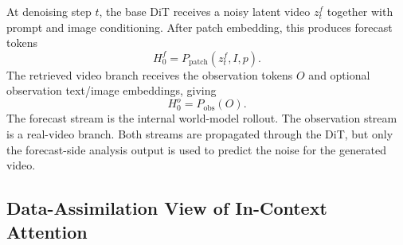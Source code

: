 \documentclass{article}
\begin{document}
At denoising step $t$, the base DiT receives a noisy latent video $z_t^{f}$ together with prompt and image conditioning. After patch embedding, this produces forecast tokens
\begin{equation}
    H_0^{f} = P_{\mathrm{patch}}(z_t^{f}, I, p).
\end{equation}
The retrieved video branch receives the observation tokens $O$ and optional observation text/image embeddings, giving
\begin{equation}
    H_0^{o} = P_{\mathrm{obs}}(O).
\end{equation}
The forecast stream is the internal world-model rollout. The observation stream is a real-video branch. Both streams are propagated through the DiT, but only the forecast-side analysis output is used to predict the noise for the generated video.

\subsection{Data-Assimilation View of In-Context Attention}
\end{document}
